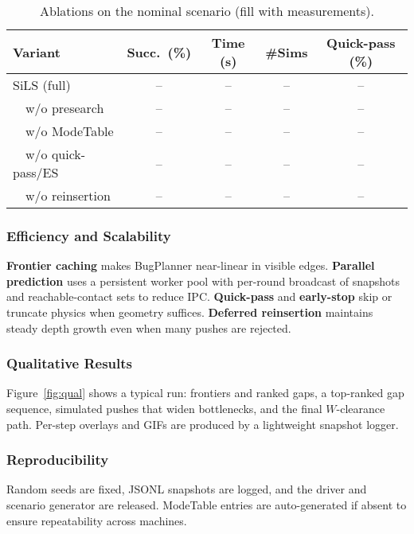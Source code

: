 \begin{table}[t]
\centering
\caption{Ablations on the nominal scenario (fill with measurements).}
\label{tab:ablation}
\vspace{2pt}
\begin{tabular}{lcccc}
\toprule
Variant & Succ.~(\%) & Time (s) & \#Sims & Quick-pass (\%) \\
\midrule
SiLS (full)            & -- & -- & -- & -- \\
\ \ w/o presearch      & -- & -- & -- & -- \\
\ \ w/o ModeTable      & -- & -- & -- & -- \\
\ \ w/o quick-pass/ES  & -- & -- & -- & -- \\
\ \ w/o reinsertion    & -- & -- & -- & -- \\
\bottomrule
\end{tabular}
\end{table}

\subsubsection{Efficiency and Scalability}
\label{subsec:eff}
\textbf{Frontier caching} makes BugPlanner near-linear in visible edges.
\textbf{Parallel prediction} uses a persistent worker pool with per-round
broadcast of snapshots and reachable-contact sets to reduce IPC.
\textbf{Quick-pass} and \textbf{early-stop} skip or truncate physics when
geometry suffices. \textbf{Deferred reinsertion} maintains steady depth
growth even when many pushes are rejected.

\subsubsection{Qualitative Results}
\label{subsec:qual}
Figure~\ref{fig:qual} shows a typical run: frontiers and ranked gaps,
a top-ranked gap sequence, simulated pushes that widen bottlenecks, and
the final $W$-clearance path. Per-step overlays and GIFs are produced by
a lightweight snapshot logger.


\subsubsection{Reproducibility}
\label{subsec:repro}
Random seeds are fixed, JSONL snapshots are logged, and the driver and
scenario generator are released. ModeTable entries are auto-generated if
absent to ensure repeatability across machines.

